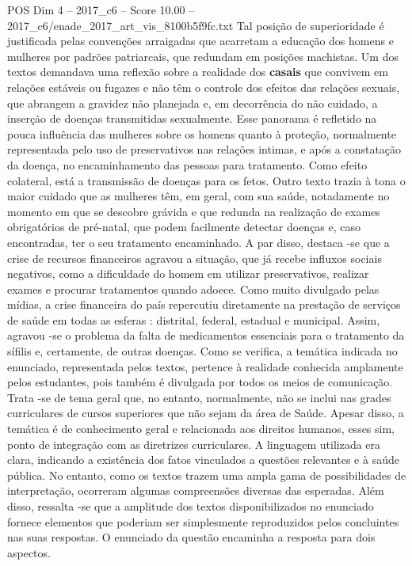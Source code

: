 \begin{textsample}{POS Dim 4 – 2017\_c6 – Score 10.00 – 2017\_c6/enade\_2017\_art\_vis\_8100b5f9fc.txt}
Tal posição de superioridade é justificada pelas convenções arraigadas que acarretam a educação dos homens e mulheres por padrões patriarcais, que redundam em posições machistas.
Um dos textos demandava uma reflexão sobre a realidade dos \textbf{casais} que convivem em relações estáveis ou fugazes e não têm o controle dos efeitos das relações sexuais, que abrangem a gravidez não planejada e, em decorrência do não cuidado, a inserção de doenças transmitidas sexualmente.
Esse panorama é refletido na pouca influência das mulheres sobre os homens quanto à proteção, normalmente representada pelo uso de preservativos nas relações intimas, e após a constatação da doença, no encaminhamento das pessoas para tratamento.
Como efeito colateral, está a transmissão de doenças para os fetos.
Outro texto trazia à tona o maior cuidado que as mulheres têm, em geral, com sua saúde, notadamente no momento em que se descobre grávida e que redunda na realização de exames obrigatórios de pré-natal, que podem facilmente detectar doenças e, caso encontradas, ter o seu tratamento encaminhado.
A par disso, destaca -se que a crise de recursos financeiros agravou a situação, que já recebe influxos sociais negativos, como a dificuldade do homem em utilizar preservativos, realizar exames e procurar tratamentos quando adoece.
Como muito divulgado pelas mídias, a crise financeira do país repercutiu diretamente na prestação de serviços de saúde em todas as esferas : distrital, federal, estadual e municipal.
Assim, agravou -se o problema da falta de medicamentos essenciais para o tratamento da sífilis e, certamente, de outras doenças.
Como se verifica, a temática indicada no enunciado, representada pelos textos, pertence à realidade conhecida amplamente pelos estudantes, pois também é divulgada por todos os meios de comunicação.
Trata -se de tema geral que, no entanto, normalmente, não se inclui nas grades curriculares de cursos superiores que não sejam da área de Saúde.
Apesar disso, a temática é de conhecimento geral e relacionada aos direitos humanos, esses sim, ponto de integração com as diretrizes curriculares.
A linguagem utilizada era clara, indicando a existência dos fatos vinculados a questões relevantes e à saúde pública.
No entanto, como os textos trazem uma ampla gama de possibilidades de interpretação, ocorreram algumas compreensões diversas das esperadas.
Além disso, ressalta -se que a amplitude dos textos disponibilizados no enunciado fornece elementos que poderiam ser simplesmente reproduzidos pelos concluintes nas suas respostas.
O enunciado da questão encaminha a resposta para dois aspectos.

\end{textsample}

